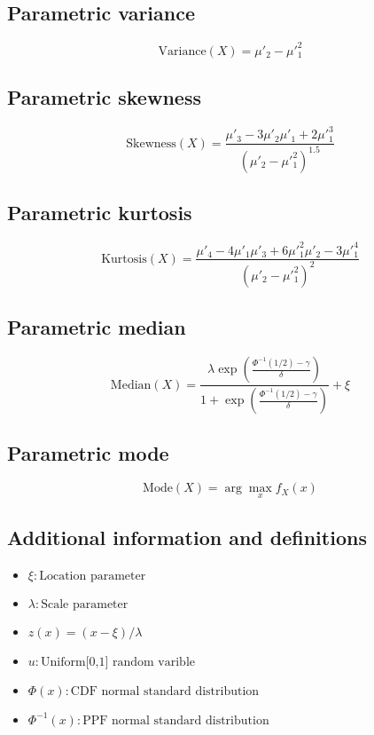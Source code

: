 \documentclass{article}
\begin{document}
\subsection{Parametric variance}
\begin{equation*} \mathrm{Variance}(X)=\mu'_{2}-\mu'^{2}_{1} \end{equation*}
\subsection{Parametric skewness}
\begin{equation*} \mathrm{Skewness}(X)=\frac{\mu'_{3}-3\mu'_{2}\mu'_{1}+2\mu'^{3}_{1}}{(\mu'_{2}-\mu'^{2}_{1})^{1.5}} \end{equation*}
\subsection{Parametric kurtosis}
\begin{equation*} \mathrm{Kurtosis}(X)=\frac{\mu'_{4}-4\mu'_{1}\mu'_{3}+6\mu'^{2}_{1}\mu'_{2}-3\mu'^{4}_{1}}{(\mu'_{2}-\mu'^{2}_{1})^{2}} \end{equation*}
\subsection{Parametric median}
\begin{equation*} \mathrm{Median}(X)=\frac{\lambda\exp\left(\frac{\Phi^{-1}\left(1/2\right)-\gamma}{\delta}\right)}{1+\exp\left(\frac{\Phi^{-1}\left(1/2\right)-\gamma}{\delta}\right)}+\xi \end{equation*}
\subsection{Parametric mode}
\begin{equation*} \mathrm{Mode}(X)=\arg\max_{x}f_{X}\left(x\right) \end{equation*}
\subsection{Additional information and definitions}
\begin{itemize}
    \item $ \xi:\text{Location parameter} $
    \item $ \lambda:\text{Scale parameter} $
    \item $ z\left(x\right)=\left(x-\xi\right)/\lambda $
    \item $ u:\text{Uniform[0,1] random varible} $
    \item $ \Phi\left(x\right):\text{CDF normal standard distribution} $
    \item $ \Phi^{-1}\left(x\right):\text{PPF normal standard distribution} $
\end{itemize}
\end{document}
